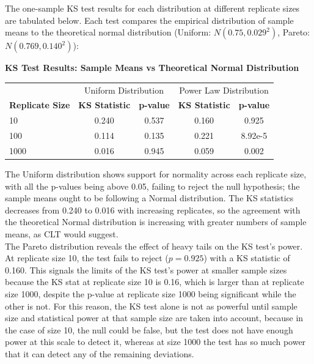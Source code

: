 The one-sample KS test results for each distribution at different replicate sizes are tabulated below. Each test compares the empirical distribution of sample means to the theoretical normal distribution (Uniform: $N(0.75, 0.029^2)$, Pareto: $N(0.769, 0.140^2)$):
\begin{center}
    \textbf{KS Test Results: Sample Means vs Theoretical Normal Distribution}
    \vspace{0.5em}
    \begin{tabular}{lcc|cc}
    \toprule
    & \multicolumn{2}{c|}{Uniform Distribution} & \multicolumn{2}{c}{Power Law Distribution} \\
    \textbf{Replicate Size} & \textbf{KS Statistic} & \textbf{p-value} & \textbf{KS Statistic} & \textbf{p-value} \\
    \midrule
    10 & 0.240 & 0.537 & 0.160 & 0.925 \\
    100 & 0.114 & 0.135 & 0.221 & 8.92e-5 \\
    1000 & 0.016 & 0.945 & 0.059 & 0.002 \\
    \bottomrule
    \end{tabular}
\end{center}

The Uniform distribution shows support for normality across each replicate size, with all the p-values being above 0.05, failing to reject the null hypothesis; the sample means ought to be following a Normal distribution. The KS statistics decreases from 0.240 to 0.016 with increasing replicates, so the agreement with the theoretical Normal distribution is increasing with greater numbers of sample means, as CLT would suggest.\\

The Pareto distribution reveals the effect of heavy tails on the KS test's power. At replicate size 10, the test fails to reject ($p=0.925$) with a KS statistic of 0.160. This signals the limits of the KS test's power at smaller sample sizes because the KS stat at replicate size 10 is 0.16, which is larger than at replicate size 1000, despite the p-value at replicate size 1000 being significant while the other is not. For this reason, the KS test alone is not as powerful until sample size and statistical power at that sample size are taken into account, because in the case of size 10, the null could be false, but the test does not have enough power at this scale to detect it, whereas at size 1000 the test has so much power that it can detect any of the remaining deviations.\\

